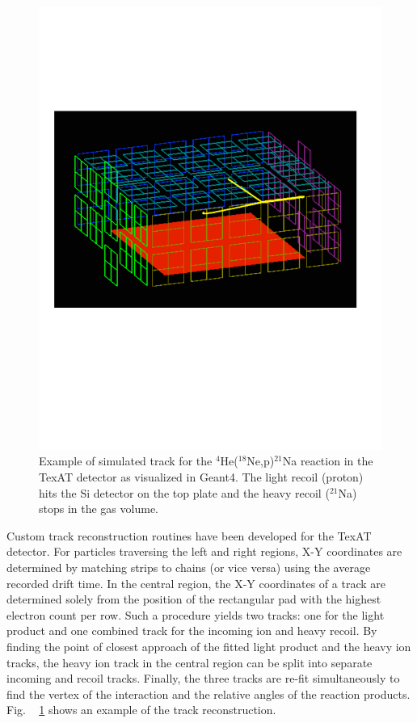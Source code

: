 \documentclass[final,number,sort&compress,5p,times,twocolumn]{elsarticle}
\begin{document}
	\begin{figure}[hbt!]
    \centering
     \includegraphics[width=1.0\columnwidth]{Figs/Simulation_1}
     \caption{Example of simulated track for the $^4$He($^{18}$Ne,p)$^{21}$Na reaction in the TexAT detector as visualized in Geant4. The light recoil (proton) hits the Si detector on the top plate and the heavy recoil ($^{21}$Na) stops in the gas volume.}
     \label{fig:Simulation_1}
   \end{figure}

	
Custom track reconstruction routines have been developed for the TexAT detector. For
particles traversing the left and right regions, X-Y coordinates are determined by matching strips
to chains (or vice versa) using the average recorded drift time. In the central region, the X-Y
coordinates of a track are determined solely from the position of the rectangular pad with the
highest electron count per row. Such a procedure yields two tracks: one for the light product and
one combined track for the incoming ion and heavy recoil. By finding the point of closest
approach of the fitted light product and the heavy ion tracks, the heavy ion track in the central
region can be split into separate incoming and recoil tracks. Finally, the three tracks are re-fit
simultaneously to find the vertex of the interaction and the relative angles of the reaction products. 
Fig. ~ \ref{fig:Simulation_1} shows an example of the track reconstruction. 
\end{document}
